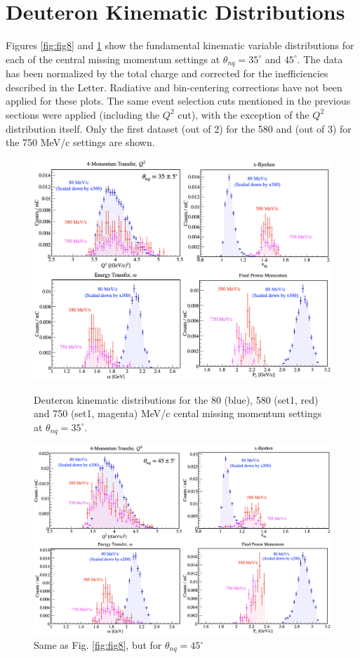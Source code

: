 \documentclass[aps, prl]{revtex4-2}  %
\begin{document}
\section{\large Deuteron Kinematic Distributions }
\noindent Figures \ref{fig:fig8} and \ref{fig:fig9} show the fundamental kinematic variable distributions for each of the central missing momentum settings at $\theta_{nq}=35^{\circ}$ and $45^{\circ}$.
The data has been normalized by the total charge and corrected for the inefficiencies described in the Letter. Radiative and bin-centering corrections have not been applied for these plots.
The same event selection cuts mentioned in the previous sections were applied (including the $Q^{2}$ cut), with the exception of the $Q^{2}$ distribution itself.
Only the first dataset (out of 2) for the 580 and (out of 3) for the 750 MeV/c settings are shown. 
\begin{figure}[!h]
\includegraphics[scale=0.4]{plots/d2_kin_thnq35.png}
\caption{Deuteron kinematic distributions for the 80 (blue), 580 (set1, red) and 750 (set1, magenta) MeV/c cental missing momentum settings at $\theta_{nq}=35^{\circ}$.}
\label{fig:fig8}
\includegraphics[scale=0.35]{plots/d2_kin_thnq45.png}
\caption{Same as Fig. \ref{fig:fig8}, but for $\theta_{nq}=45^{\circ}$}
\label{fig:fig9}
\end{figure}
\clearpage
\end{document}
